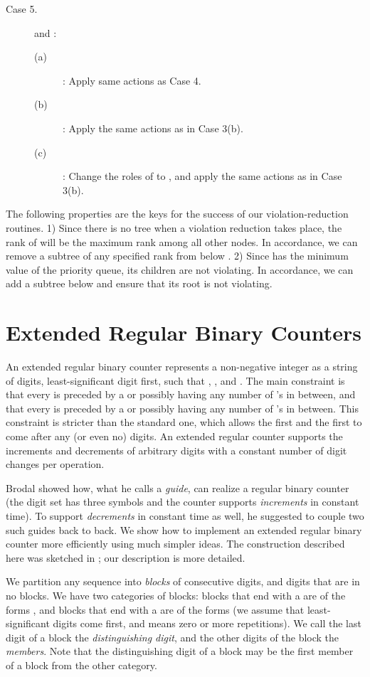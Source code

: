 \documentclass{llncs}
\begin{document}
\begin{description}
\item[Case 5.]  and :
\begin{description}
\item[(a)] : Apply same actions as Case 4.
\item[(b)] : Apply the same actions as in Case 3(b).
\item[(c)] : Change the roles of
   to , and apply the same actions as in Case 3(b).
\end{description}
\end{description}

The following properties are the keys for the success of our violation-reduction routines.
1) Since there is no tree  when a violation reduction takes place, 
the rank of  will be the maximum rank among all other nodes. 
In accordance, we can remove a subtree of any specified rank from below .
2) Since  has the minimum value of the priority queue, its children 
are not violating. In accordance, we can add a subtree below  and ensure that
its root is not violating.
   

\section{Extended Regular Binary Counters}

An extended regular binary counter represents a non-negative integer
 as a string  of digits,
least-sig\-nifi\-cant digit first, such that ,
, and .  The main
constraint is that every  is preceded by a  or  possibly
having any number of 's in between, and that every  is preceded
by a  or  possibly having any number of 's in between.  This
constraint is stricter than the standard one, which allows the first
 and the first  to come after any (or even no) digits.  An
extended regular counter \cite{CK77,KST02} supports the increments and
decrements of arbitrary digits with a constant number of digit changes
per operation.

Brodal \cite{Bro96} showed how, what he calls a \emph{guide},
can realize a regular binary counter (the digit set has three symbols
and the counter supports {\it increments} in constant time).  To support
{\it decrements} in constant time as well, he suggested to couple two such
guides back to back.  We show how to implement an extended regular
binary counter more efficiently using much simpler ideas. The
construction described here was sketched in \cite{KST02}; our
description is more detailed.

We partition any sequence into \emph{blocks} of consecutive digits,
and digits that are in no blocks.  We have two categories of blocks:
blocks that end with a  are of the forms , and blocks
that end with a  are of the forms  (we assume that
least-significant digits come first, and  means zero or more
repetitions).  We call the last digit of a block the
\emph{distinguishing digit}, and the other digits of the block the
\emph{members}.  Note that the distinguishing digit of a block may be
the first member of a block from the other category.
\end{document}
